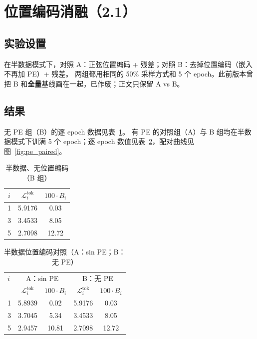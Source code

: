 \documentclass[UTF8,a4paper,11pt]{ctexart}
\newcommand{\Lt}{\mathcal{L}^{\mathrm{tok}}}
\newcommand{\Lti}[1]{\Lt_{#1}}
\begin{document}
\section{位置编码消融（2.1）}

\subsection{实验设置}

在半数据模式下，对照 A：正弦位置编码 + 残差；对照 B：去掉位置编码（嵌入不再加 PE）+ 残差。
两组都用相同的 50\% 采样方式和 5 个 epoch。此前版本曾把 B 和\textbf{全量}基线画在一起，已作废；正文只保留 A vs B。

\subsection{结果}

无 PE 组（B）的逐 epoch 数据见表~\ref{tab:none_pe}。
有 PE 的对照组（A）与 B 组均在半数据模式下训满 5 个 epoch；逐 epoch 数值见表~\ref{tab:pe_paired}，配对曲线见图~\ref{fig:pe_paired}。

\begin{table}[htbp]
  \centering
  \caption{半数据、无位置编码（B 组）}
  \label{tab:none_pe}
  \begin{tabular}{ccc}
    \toprule
    $i$ & $\Lti{i}$ & $100\cdot B_i$ \\
    \midrule
    1 & 5.9176 & 0.03 \\
    3 & 3.4533 & 8.05 \\
    5 & 2.7098 & 12.72 \\
    \bottomrule
  \end{tabular}
\end{table}

\begin{table}[htbp]
  \centering
  \caption{半数据位置编码对照（A：sin PE；B：无 PE）}
  \label{tab:pe_paired}
  \begin{tabular}{lcc|cc}
    \toprule
    $i$ & \multicolumn{2}{c|}{A：sin PE} & \multicolumn{2}{c}{B：无 PE} \\
        & $\Lti{i}$ & $100\cdot B_i$ & $\Lti{i}$ & $100\cdot B_i$ \\
    \midrule
    1 & 5.8939 & 0.02 & 5.9176 & 0.03 \\
    3 & 3.7045 & 5.34 & 3.4533 & 8.05 \\
    5 & 2.9457 & 10.81 & 2.7098 & 12.72 \\
    \bottomrule
  \end{tabular}
\end{table}
\end{document}
